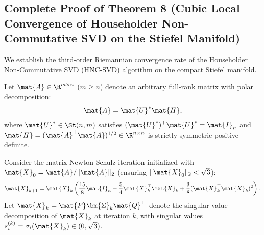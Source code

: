 \subsection{Complete Proof of Theorem 8 (Cubic Local Convergence of Householder Non-Commutative SVD on the Stiefel Manifold)}
\label{sec:appendix_a8_thm8}

We establish the third-order Riemannian convergence rate of the Householder Non-Commutative SVD (HNC-SVD) algorithm on the compact Stiefel manifold.

\begin{theorem}
\label{thm:hnc_optimality}
Let $\mat{A} \in \R^{m \times n}$ ($m \ge n$) denote an arbitrary full-rank matrix with polar decomposition:
\begin{equation}
\mat{A} = \mat{U}^* \mat{H},
\label{eq:polar_decomp_def}
\end{equation}
where $\mat{U}^* \in \St(n, m)$ satisfies $(\mat{U}^*)^\top \mat{U}^* = \mat{I}_n$ and $\mat{H} = (\mat{A}^\top \mat{A})^{1/2} \in \R^{n \times n}$ is strictly symmetric positive definite.

Consider the matrix Newton-Schulz iteration initialized with $\mat{X}_0 = \mat{A} / \|\mat{A}\|_2$ (ensuring $\|\mat{X}_0\|_2 < \sqrt{3}$):
\begin{equation}
\mat{X}_{k+1} = \mat{X}_k \left( \frac{15}{8} \mat{I}_n - \frac{5}{4} \mat{X}_k^\top \mat{X}_k + \frac{3}{8} (\mat{X}_k^\top \mat{X}_k)^2 \right).
\label{eq:newton_schulz_iteration_canonical}
\end{equation}
Let $\mat{X}_k = \mat{P} \bm{\Sigma}_k \mat{Q}^\top$ denote the singular value decomposition of $\mat{X}_k$ at iteration $k$, with singular values $s_i^{(k)} = \sigma_i(\mat{X}_k) \in (0, \sqrt{3})$.


\end{theorem}
